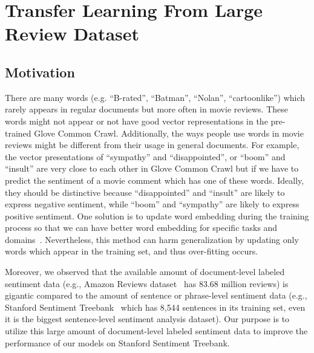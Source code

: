 \section{Transfer Learning From Large Review Dataset}
\subsection{Motivation}\label{sec:we-motive}
There are many words (e.g. ``B-rated'', ``Batman'', ``Nolan'', ``cartoonlike'') which rarely appears in regular documents but more often in movie reviews.
These words might not appear or not have good vector representations in the pre-trained Glove Common Crawl.
Additionally, the ways people use words in movie reviews might be different from their usage in general documents.
For example, the vector presentations of ``sympathy'' and ``disappointed'', or ``boom'' and ``insult'' are very close to each other in Glove Common Crawl but if we have to predict the sentiment of a movie comment which has one of these words.
Ideally, they should be distinctive because ``disappointed'' and ``insult'' are likely to express negative sentiment, while ``boom'' and ``sympathy'' are likely to express positive sentiment.
One solution is to update word embedding during the training process so that we can have better word embedding for specific tasks and domains~\cite{treeLSTM, KimCNN}.
Nevertheless, this method can harm generalization by updating only words which appear in the training set, and thus over-fitting occurs. %
%  
% 
% 
 
Moreover, we observed that the available amount of document-level labeled sentiment data (e.g., Amazon Reviews dataset~\cite{amazon-reviews} has 83.68 million reviews) is gigantic compared to the amount of sentence or phrase-level sentiment data (e.g., Stanford Sentiment Treebank~\cite{socher2013recursive} which has 8,544 sentences in its training set, even it is the biggest sentence-level sentiment analysis dataset). 
Our purpose is to utilize this large amount of document-level labeled sentiment data to improve the performance of our models on Stanford Sentiment Treebank. 
 
